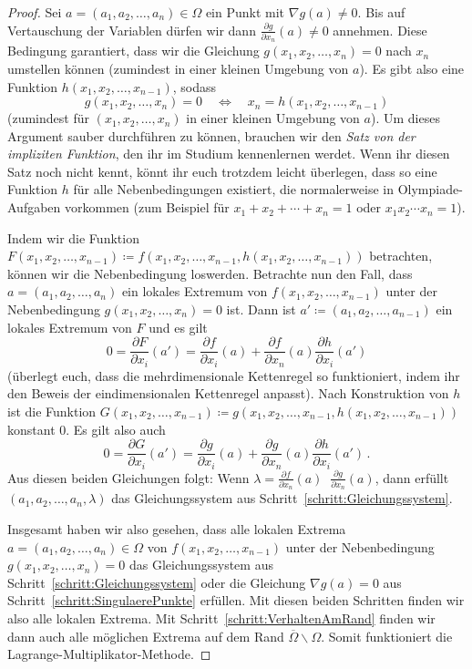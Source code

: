 \begin{proof}
	Sei $a=(a_1,a_2,\dotsc,a_n)\in\Omega$ ein Punkt mit $\nabla g(a)\neq 0$. Bis auf Vertauschung der Variablen dürfen wir dann $\frac{\partial g}{\partial x_n}(a)\neq 0$ annehmen. Diese Bedingung garantiert, dass wir die Gleichung $g(x_1,x_2,\dotsc,x_n)=0$ nach $x_n$ umstellen können (zumindest in einer kleinen Umgebung von $a$). Es gibt also eine Funktion $h(x_1,x_2,\dotsc,x_{n-1})$, sodass
	\begin{equation*}
		g(x_1,x_2,\dotsc,x_n)=0\quad\Longleftrightarrow \quad x_n=h(x_1,x_2,\dotsc,x_{n-1})
	\end{equation*}
	(zumindest für $(x_1,x_2,\dotsc,x_n)$ in einer kleinen Umgebung von $a$). Um dieses Argument sauber durchführen zu können, brauchen wir den \emph{Satz von der impliziten Funktion}, den ihr im Studium kennenlernen werdet. Wenn ihr diesen Satz noch nicht kennt, könnt ihr euch trotzdem leicht überlegen, dass so eine Funktion $h$ für alle Nebenbedingungen existiert, die normalerweise in Olympiade-Aufgaben vorkommen (zum Beispiel für $x_1+x_2+\dotsb+x_n=1$ oder $x_1x_2\dotsm x_n=1$).
	
	Indem wir die Funktion $F(x_1,x_2,\dotsc,x_{n-1})\coloneqq f(x_1,x_2,\dotsc,x_{n-1},h(x_1,x_2,\dotsc,x_{n-1}))$ betrachten, können wir die Nebenbedingung loswerden. Betrachte nun den Fall, dass $a=(a_1,a_2,\dotsc,a_n)$ ein lokales Extremum von $f(x_1,x_2,\dotsc,x_{n-1})$ unter der Nebenbedingung $g(x_1,x_2,\dotsc,x_n)=0$ ist. Dann ist $a'\coloneqq (a_1,a_2,\dotsc,a_{n-1})$ ein lokales Extremum von $F$ und es gilt
	\begin{equation*}
		0=\frac{\partial F}{\partial x_i}(a')=\frac{\partial f}{\partial x_i}(a)+\frac{\partial f}{\partial x_n}(a)\frac{\partial h}{\partial x_i}(a')
	\end{equation*}
	(überlegt euch, dass die mehrdimensionale Kettenregel so funktioniert, indem ihr den Beweis der eindimensionalen Kettenregel anpasst). Nach Konstruktion von $h$ ist die Funktion $G(x_1,x_2,\dotsc,x_{n-1})\coloneqq g(x_1,x_2,\dotsc,x_{n-1},h(x_1,x_2,\dotsc,x_{n-1}))$ konstant $0$. Es gilt also auch
	\begin{equation*}
		0=\frac{\partial G}{\partial x_i}(a')=\frac{\partial g}{\partial x_i}(a)+\frac{\partial g}{\partial x_n}(a)\frac{\partial h}{\partial x_i}(a')\,.
	\end{equation*}
	Aus diesen beiden Gleichungen folgt: Wenn $\lambda=\frac{\partial f}{\partial x_n}(a)\mathop{\big/}\frac{\partial g}{\partial x_n}(a)$, dann erfüllt $(a_1,a_2,\dotsc,a_n,\lambda)$ das Gleichungssystem aus Schritt~\ref{schritt:Gleichungssystem}.
	
	Insgesamt haben wir also gesehen, dass alle lokalen Extrema $a=(a_1,a_2,\dotsc,a_n)\in\Omega$ von $f(x_1,x_2,\dotsc,x_{n-1})$ unter der Nebenbedingung $g(x_1,x_2,\dotsc,x_n)=0$ das Gleichungssystem aus Schritt~\ref{schritt:Gleichungssystem} oder die Gleichung $\nabla g(a)=0$ aus Schritt~\ref{schritt:SingulaerePunkte} erfüllen. Mit diesen beiden Schritten finden wir also alle lokalen Extrema. Mit Schritt~\ref{schritt:VerhaltenAmRand} finden wir dann auch alle möglichen Extrema auf dem Rand $\overline{\Omega}\smallsetminus \Omega$. Somit funktioniert die Lagrange-Multiplikator-Methode.
\end{proof}

